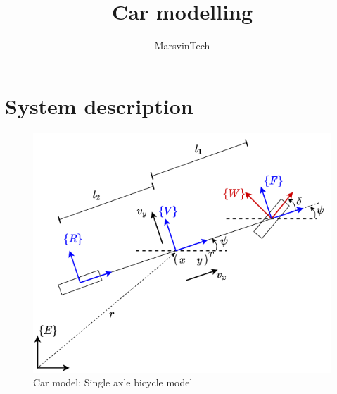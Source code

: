\documentclass[12pt]{article}
\title{Car modelling}
\author{MarsvinTech}
\begin{document}
\maketitle

\section{System description}
\begin{figure}[H]
    \centering
    \includegraphics[scale=0.8]{images/car_modelling_1.png}
    \caption{Car model: Single axle bicycle model}
    \label{fig:car_system}
\end{figure}
\end{document}

